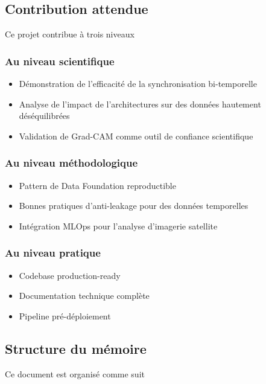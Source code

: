 \documentclass[12pt,a4paper]{article}
\begin{document}
\subsection{Contribution attendue}
Ce projet contribue à trois niveaux\:

\subsubsection{Au niveau scientifique}
\begin{itemize}
    \item Démonstration de l'efficacité de la synchronisation bi-temporelle
    \item Analyse de l'impact de l'architectures sur des données hautement déséquilibrées
    \item Validation de Grad-CAM comme outil de confiance scientifique
\end{itemize}

\subsubsection{Au niveau méthodologique}
\begin{itemize}
    \item Pattern de Data Foundation reproductible
    \item Bonnes pratiques d'anti-leakage pour des données temporelles
    \item Intégration MLOps pour l'analyse d'imagerie satellite
\end{itemize}

\subsubsection{Au niveau pratique}
\begin{itemize}
    \item Codebase production-ready
    \item Documentation technique complète
    \item Pipeline pré-déploiement
\end{itemize}

\subsection{Structure du mémoire}
Ce document est organisé comme suit\:
\end{document}
